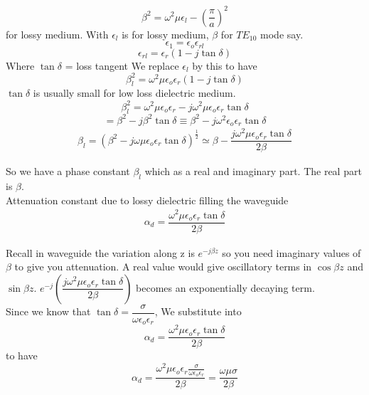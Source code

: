 \begin{equation}
	\beta^{2} = \omega^{2}\mu\epsilon_{l} - (\frac{\pi}{a})^{2}
\end{equation}
	for lossy medium. With $\epsilon_{l}$ is for lossy medium, $\beta$ for $TE_{10}$ mode say.
\begin{equation}
	\epsilon_{1} = \epsilon_{o}\epsilon_{rl}
\end{equation}
\begin{equation}
	\epsilon_{rl} = \epsilon_{r}(1-j\tan\delta)
\end{equation}
	Where $\tan\delta$ = loss tangent
	We replace $\epsilon_{l}$ by this to have \
\begin{equation}
	\beta^{2}_{l} = \omega^{2}\mu\epsilon_{o}\epsilon_{r}(1-j\tan\delta)
\end{equation}
	$\tan\delta$ is usually small for low loss dielectric medium.\\
$$
	\beta^{2}_{l} = \omega^{2}\mu\epsilon_{o}\epsilon_{r} - j\omega^{2}\mu\epsilon_{o}\epsilon_{r}\tan\delta$$
	$$ = \beta^{2} - j\beta^{2}\tan\delta \equiv \beta^{2} - j\omega^{2}\epsilon_{o}\epsilon_{r}\tan\delta
$$
\begin{align}
	\beta_{l} = (\beta^{2} - j\omega\mu\epsilon_{o}\epsilon_{r}\tan\delta)^{\frac{1}{2}} \simeq \beta - \dfrac{j\omega^{2}\mu\epsilon_{o}\epsilon_{r}\tan\delta}{2\beta}
\end{align}

So we have a phase constant $\beta_{l}$ which as a real and imaginary part. The real part is $\beta$.\\
Attenuation constant due to lossy dielectric filling the waveguide
\begin{align}
	 \alpha_{d} = \dfrac{\omega^{2}\mu\epsilon_{o}\epsilon_{r}\tan\delta}{2\beta}
\end{align}
		
	Recall in waveguide the variation along z is $e^{-j\beta z}$ so you need imaginary values of $\beta$ to give you attenuation. A real value would give oscillatory terms in $\cos\beta z$ and $\sin\beta z$. $e^{-j}(\dfrac{j\omega^{2} \mu\epsilon_{o}\epsilon_{r}\tan\delta}{2\beta})$
	becomes an exponentially decaying term.\\

	Since we know that $\tan\delta = \dfrac{\sigma}{\omega\epsilon_{o}\epsilon_{r}}$, We substitute into $$\alpha_{d} = \dfrac{\omega^{2}\mu\epsilon_{o}\epsilon_{r}\tan\delta}{2\beta}$$ to have 
$$
		\alpha_{d} = \dfrac{\omega^{2}\mu\epsilon_{o}\epsilon_{r}\frac{\sigma}{\omega\epsilon_{o}\epsilon_{r}}}{2\beta} = \dfrac{\omega\mu\sigma}{2\beta}
$$
	
